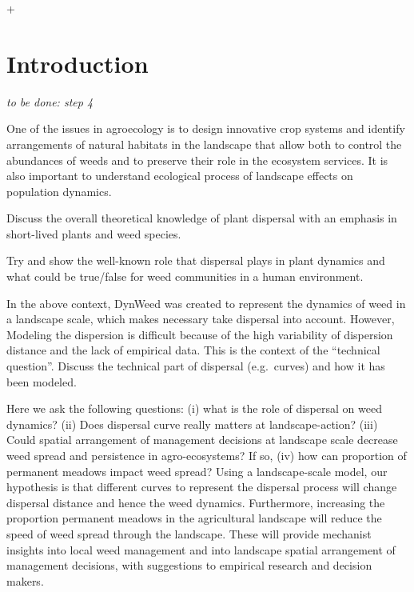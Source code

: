 +\documentclass[12pt]{article}
\begin{document}

\section{Introduction}\label{introduction}

\emph{to be done: step 4}

One of the issues in agroecology is to design innovative crop systems
and identify arrangements of natural habitats in the landscape that
allow both to control the abundances of weeds and to preserve their role
in the ecosystem services. It is also important to understand ecological
process of landscape effects on population dynamics.

Discuss the overall theoretical knowledge of plant dispersal with an
emphasis in short-lived plants and weed species.

Try and show the well-known role that dispersal plays in plant dynamics
and what could be true/false for weed communities in a human
environment.

In the above context, DynWeed was created to represent the dynamics of
weed in a landscape scale, which makes necessary take dispersal into
account. However, Modeling the dispersion is difficult because of the
high variability of dispersion distance and the lack of empirical data.
This is the context of the \enquote{technical question}. Discuss the
technical part of dispersal (e.g.~curves) and how it has been modeled.

Here we ask the following questions: (i) what is the role of dispersal
on weed dynamics? (ii) Does dispersal curve really matters at
landscape-action? (iii) Could spatial arrangement of management
decisions at landscape scale decrease weed spread and persistence in
agro-ecosystems? If so, (iv) how can proportion of permanent meadows
impact weed spread? Using a landscape-scale model, our hypothesis is
that different curves to represent the dispersal process will change
dispersal distance and hence the weed dynamics. Furthermore, increasing
the proportion permanent meadows in the agricultural landscape will
reduce the speed of weed spread through the landscape. These will
provide mechanist insights into local weed management and into landscape
spatial arrangement of management decisions, with suggestions to
empirical research and decision makers.
\end{document}
